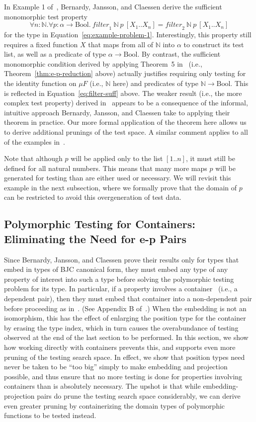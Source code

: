 \documentclass{article}[12 pt]
\theoremstyle{problemstyle}
\begin{document}
In Example 1 of~\cite{bjc10}, Bernardy, Jansson, and Claessen derive
the sufficient monomorphic test property
\[ \forall n : \mathbb{N}. \forall p : \alpha \to
\mathrm{Bool}.~\mathit{filter}_1~\mathbb{N}~p~[X_1..X_n] =
\mathit{filter}_2~\mathbb{N}~p~[X_1..X_n]\] for the type in
Equation~\ref{eq:example-problem-1}.  Interestingly, this property
still requires a fixed function $X$ that maps from all of $\mathbb{N}$
into $\alpha$ to construct its test list, as well as a predicate of
type $\alpha \to \mathrm{Bool}$. By contrast, the sufficient
monomorphic condition derived by applying Theorem~5 in~\cite{bjc10}
(i.e., Theorem~\ref{thm:e-p-reduction} above) actually justifies
requiring only testing for the identity function on $\mu F$ (i.e.,
$\mathbb{N}$ here) and predicates of type $\mathbb{N} \to
\mathrm{Bool}$. This is reflected in Equation~\ref{eq:filter-suff}
above. The weaker result (i.e., the more complex test property)
derived in~\cite{bjc10} appears to be a consequence of the informal,
intuitive approach Bernardy, Jansson, and Claessen take to applying
their theorem in practice. Our more formal application of the theorem
here allows us to derive additional prunings of the test space. A
similar comment applies to all of the examples in~\cite{bjc10}.

Note that although $p$ will be applied only to the list $[1..n]$, it
must still be defined for all natural numbers. This means that many
more maps $p$ will be generated for testing than are either used or
necessary. We will revisit this example in the next subsection, where
we formally prove that the domain of $p$ can be restricted to avoid
this overgeneration of test data.

\subsection{Polymorphic Testing for Containers: Eliminating the Need
  for e-p Pairs}\label{sec:dep-conts} 

Since Bernardy, Jansson, and Claessen prove their results only for
types that embed in types of BJC canonical form, they must embed any
type of any property of interest into such a type before solving the
polymorphic testing problem for its type. In particular, if a property
involves a container~\cite{aag03} (i.e., a dependent pair), then they
must embed that container into a non-dependent pair before proceeding
as in~\cite{bjc10}. (See Appendix B of~\cite{bjc10}.) When the
embedding is not an isomorphism, this has the effect of enlarging the
position type for the container by erasing the type index, which in
turn causes the overabundance of testing observed at the end of the
last section to be performed. In this section, we show how working
directly with containers prevents this, and supports even more pruning
of the testing search space. In effect, we show that position types
need never be taken to be ``too big'' simply to make embedding and
projection possible, and thus ensure that no more testing is done for
properties involving containers than is absolutely necessary. The
upshot is that while embedding-projection pairs do prune the testing
search space considerably, we can derive even greater pruning by
containerizing the domain types of polymorphic functions to be tested
instead.
\end{document}
